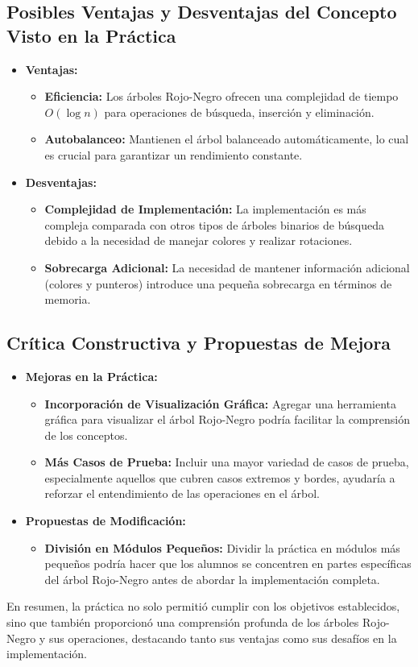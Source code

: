 \documentclass[12pt]{article}
\begin{document}
\subsection*{Posibles Ventajas y Desventajas del Concepto Visto en la Práctica}

\begin{itemize}
    \item \textbf{Ventajas:}
    \begin{itemize}
        \item \textbf{Eficiencia:} Los árboles Rojo-Negro ofrecen una complejidad de tiempo \(O(\log n)\) para operaciones de búsqueda, inserción y eliminación.
        \item \textbf{Autobalanceo:} Mantienen el árbol balanceado automáticamente, lo cual es crucial para garantizar un rendimiento constante.
    \end{itemize}
    \item \textbf{Desventajas:}
    \begin{itemize}
        \item \textbf{Complejidad de Implementación:} La implementación es más compleja comparada con otros tipos de árboles binarios de búsqueda debido a la necesidad de manejar colores y realizar rotaciones.
        \item \textbf{Sobrecarga Adicional:} La necesidad de mantener información adicional (colores y punteros) introduce una pequeña sobrecarga en términos de memoria.
    \end{itemize}
\end{itemize}

\subsection*{Crítica Constructiva y Propuestas de Mejora}

\begin{itemize}
    \item \textbf{Mejoras en la Práctica:}
    \begin{itemize}
        \item \textbf{Incorporación de Visualización Gráfica:} Agregar una herramienta gráfica para visualizar el árbol Rojo-Negro podría facilitar la comprensión de los conceptos.
        \item \textbf{Más Casos de Prueba:} Incluir una mayor variedad de casos de prueba, especialmente aquellos que cubren casos extremos y bordes, ayudaría a reforzar el entendimiento de las operaciones en el árbol.
    \end{itemize}
    \item \textbf{Propuestas de Modificación:}
    \begin{itemize}
        \item \textbf{División en Módulos Pequeños:} Dividir la práctica en módulos más pequeños podría hacer que los alumnos se concentren en partes específicas del árbol Rojo-Negro antes de abordar la implementación completa.
    \end{itemize}
\end{itemize}

En resumen, la práctica no solo permitió cumplir con los objetivos establecidos, sino que también proporcionó una comprensión profunda de los árboles Rojo-Negro y sus operaciones, destacando tanto sus ventajas como sus desafíos en la implementación.
\end{document}
